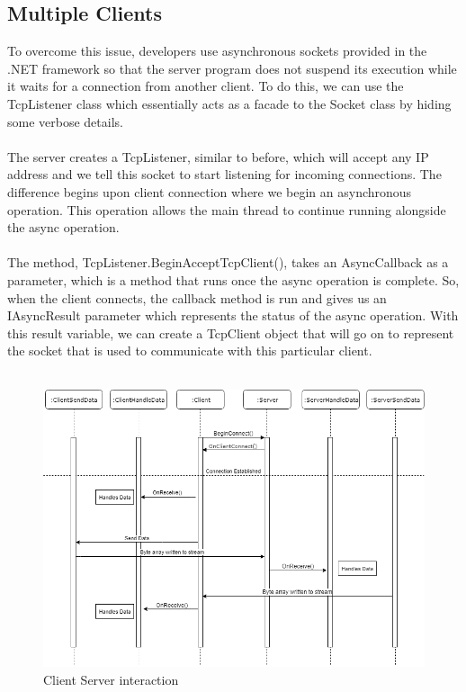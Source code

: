 \documentclass[a4paper]{report}
\begin{document}
\subsection{Multiple Clients}
To overcome this issue, developers use asynchronous sockets provided in the .NET framework so that the server program does not suspend its execution while it waits for a connection from another client. To do this, we can use the TcpListener class which essentially acts as a facade to the Socket class by hiding some verbose details. \cite{Server}
\\\\
The server creates a TcpListener, similar to before, which will accept any IP address and we tell this socket to start listening for incoming connections. The difference begins upon client connection where we begin an asynchronous operation. This operation allows the main thread to continue running alongside the async operation. 
\\\\
The method, TcpListener.BeginAcceptTcpClient(), takes an AsyncCallback as a parameter, which is a method that runs once the async operation is complete. So, when the client connects, the callback method is run and gives us an IAsyncResult parameter which represents the status of the async operation. With this result variable, we can create a TcpClient object that will go on to represent the socket that is used to communicate with this particular client.
\\\\
\begin{figure}[h]
	\centering
	\includegraphics[scale=0.55]{client-server}
	\caption{Client Server interaction}
\end{figure}
\end{document}
